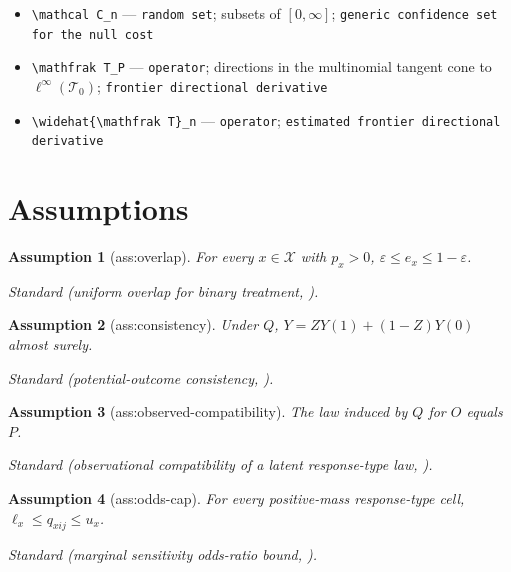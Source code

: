 \documentclass{article}
\newtheorem{assumption}{Assumption}
\begin{document}
\begin{itemize}
  \par\smallskip\noindent\emph{Definition.} \(\theta_{n,h}\) has \(e_x=1/2\), \(p_1=4/5+h/n\), and \(p_0=1/5\)
  \item \texttt{\textbackslash{}\allowbreak{}mathcal C\_\allowbreak{}n} --- \texttt{random set}; subsets of \([0,\infty]\); \texttt{generic confidence set for the null cost}
  \item \texttt{\textbackslash{}\allowbreak{}mathfrak T\_\allowbreak{}P} --- \texttt{operator}; directions in the multinomial tangent cone to \(\ell^\infty(\mathcal T_0)\); \texttt{frontier directional derivative}
  \item \texttt{\textbackslash{}\allowbreak{}widehat\{\textbackslash{}\allowbreak{}mathfrak T\}\allowbreak{}\_\allowbreak{}n} --- \texttt{operator}; \texttt{estimated frontier directional derivative}
\end{itemize}

\section{Assumptions}

\begin{assumption}[ass:overlap]\label{ass:overlap}
For every \(x\in\mathcal X\) with \(p_x>0\), \(\varepsilon\leq e_x\leq1-\varepsilon\).
\par\smallskip\noindent\emph{Standard} (uniform overlap for binary treatment, \cite{Tan2006Distributional}).
\end{assumption}

\begin{assumption}[ass:consistency]\label{ass:consistency}
Under \(Q\), \(Y=ZY(1)+(1-Z)Y(0)\) almost surely.
\par\smallskip\noindent\emph{Standard} (potential-outcome consistency, \cite{Rubin1974Estimating}).
\end{assumption}

\begin{assumption}[ass:observed-compatibility]\label{ass:observed-compatibility}
The law induced by \(Q\) for \(O\) equals \(P\).
\par\smallskip\noindent\emph{Standard} (observational compatibility of a latent response-type law, \cite{BalkePearl1997Bounds}).
\end{assumption}

\begin{assumption}[ass:odds-cap]\label{ass:odds-cap}
For every positive-mass response-type cell, \(\ell_x\leq q_{xij}\leq u_x\).
\par\smallskip\noindent\emph{Standard} (marginal sensitivity odds-ratio bound, \cite{Tan2006Distributional}).
\end{assumption}
\end{document}

